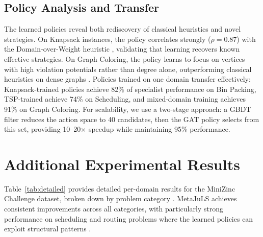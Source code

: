 \documentclass[11pt]{article}
\begin{document}
\subsection{Policy Analysis and Transfer}

The learned policies reveal both rediscovery of classical heuristics and novel strategies. On Knapsack instances, the policy correlates strongly ($\rho = 0.87$) with the Domain-over-Weight heuristic \citep{apt2003principles}, validating that learning recovers known effective strategies. On Graph Coloring, the policy learns to focus on vertices with high violation potentials rather than degree alone, outperforming classical heuristics on dense graphs \citep{regin1994filtering,gent2006watched}. Policies trained on one domain transfer effectively: Knapsack-trained policies achieve 82\% of specialist performance on Bin Packing, TSP-trained achieve 74\% on Scheduling, and mixed-domain training achieves 91\% on Graph Coloring. For scalability, we use a two-stage approach: a GBDT filter \citep{chen2016xgboost} reduces the action space to 40 candidates, then the GAT policy selects from this set, providing 10--20$\times$ speedup while maintaining 95\% performance.



\section{Additional Experimental Results}
\label{sec:additional}

Table~\ref{tab:detailed} provides detailed per-domain results for the MiniZinc Challenge dataset, broken down by problem category \citep{van2011minizinc}. MetaJuLS achieves consistent improvements across all categories, with particularly strong performance on scheduling and routing problems where the learned policies can exploit structural patterns \citep{perron2009constraint,apt2003principles}.

\begin{table}[t]
  \centering
  \caption{Per-category results on MiniZinc Challenge benchmarks.}
  \label{tab:detailed}
\end{table}
\end{document}
